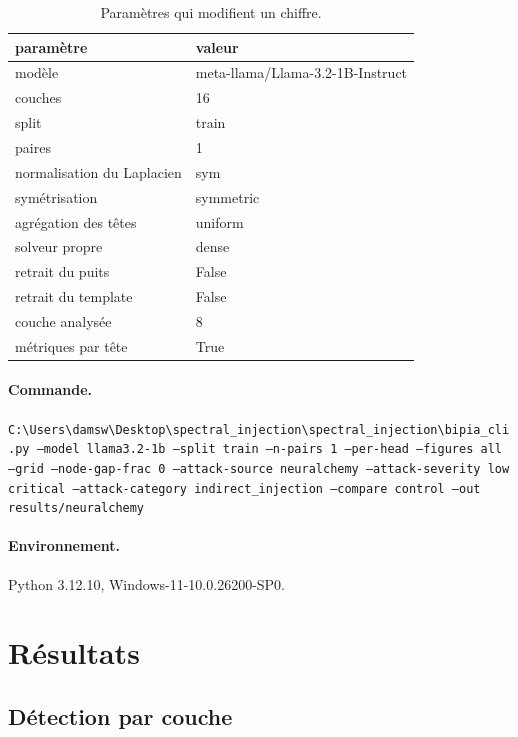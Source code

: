 \documentclass[11pt,a4paper]{article}
\begin{document}
\begin{table}[htbp]\centering\small
\begin{tabular}{ll}
\hline
paramètre & valeur \\
\hline
modèle & meta-llama/Llama-3.2-1B-Instruct \\
couches & 16 \\
split & train \\
paires & 1 \\
normalisation du Laplacien & sym \\
symétrisation & symmetric \\
agrégation des têtes & uniform \\
solveur propre & dense \\
retrait du puits & False \\
retrait du template & False \\
couche analysée & 8 \\
métriques par tête & True \\
\hline
\end{tabular}
\caption{Paramètres qui modifient un chiffre.}
\label{tab:config}
\end{table}


\paragraph{Commande.}
\texttt{C:\textbackslash{}Users\textbackslash{}damsw\textbackslash{}Desktop\textbackslash{}spectral\_injection\textbackslash{}spectral\_injection\textbackslash{}bipia\_cli.py --model llama3.2-1b --split train --n-pairs 1 --per-head --figures all --grid --node-gap-frac 0 --attack-source neuralchemy --attack-severity low critical --attack-category indirect\_injection --compare control --out results/neuralchemy}

\paragraph{Environnement.}
Python 3.12.10, Windows-11-10.0.26200-SP0.


\section{Résultats}

\subsection{Détection par couche}
\end{document}
